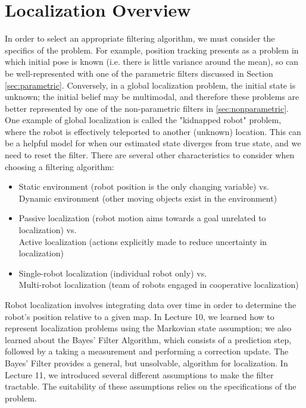\documentclass[twoside]{article}
\begin{document}
\section{Localization Overview}
In order to select an appropriate filtering algorithm, we must consider the specifics of the problem.
For example, position tracking presents as a problem in which initial pose is known (i.e. there is little variance around the mean), so can be well-represented with one of the parametric filters discussed in Section \ref{sec:parametric}. Conversely, in a global localization problem, the initial state is unknown; the initial belief may be multimodal, and therefore these problems are better represented by one of the non-parametric filters in \ref{sec:nonparametric}. One example of global localization is called the "kidnapped robot" problem, where the robot is effectively teleported to another (unknown) location. This can be a helpful model for when our estimated state diverges from true state, and we need to reset the filter.
There are several other characteristics to consider when choosing a filtering algorithm:
\begin{itemize}
    \item Static environment (robot position is the only changing variable) vs.\\
    Dynamic environment (other moving objects exist in the environment)
    \item Passive localization (robot motion aims towards a goal unrelated to localization) vs.\\
    Active localization (actions explicitly made to reduce uncertainty in localization)
    \item Single-robot localization (individual robot only) vs.\\
    Multi-robot localization (team of robots engaged in cooperative localization)
\end{itemize}

Robot localization involves integrating data over time in order to determine the robot's position relative to a given map. In Lecture 10, we learned how to represent localization problems using the Markovian state assumption; we also learned about the Bayes' Filter Algorithm, which consists of a prediction step, followed by a taking a measurement and performing a correction update. The Bayes' Filter provides a general, but unsolvable, algorithm for localization. In Lecture 11, we introduced several different assumptions to make the filter tractable. The suitability of these assumptions relies on the specifications of the problem.
\end{document}
